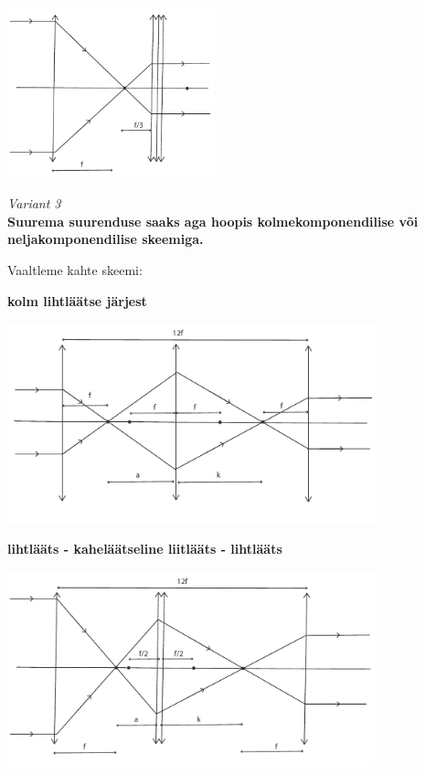 \vspace{-10pt}
  \begin{center}
    \includegraphics[width=0.45\textwidth]{2020-v2g-10-yl2.pdf}
  \end{center}
  \vspace{-10pt}


\emph{Variant 3}\\
\textbf{Suurema suurenduse saaks aga hoopis kolmekomponendilise  või neljakomponendilise skeemiga.}

Vaaltleme kahte skeemi:

\textbf{kolm lihtläätse järjest}

\vspace{-10pt}
  \begin{center}
    \includegraphics[width=0.8\textwidth]{2020-v2g-10-yl3.pdf}
  \end{center}
  \vspace{-10pt}

\textbf{lihtlääts - kaheläätseline liitlääts - lihtlääts}

\vspace{-10pt}
  \begin{center}
    \includegraphics[width=0.8\textwidth]{2020-v2g-10-yl4.pdf}
  \end{center}
  \vspace{-10pt}

